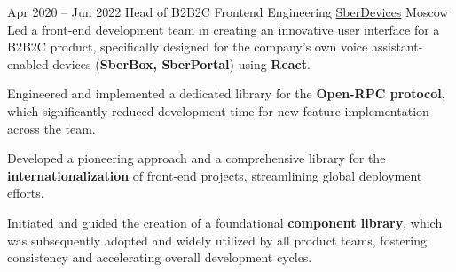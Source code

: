 \cventry
{Apr 2020 – Jun 2022}
{Head of B2B2C Frontend Engineering}
{\href{https://sberdevices.ru}{SberDevices}}
{Moscow}
{}
{Led a front-end development team in creating an innovative user interface for a B2B2C product, specifically designed for the company's own voice assistant-enabled devices (\textbf{SberBox, SberPortal}) using \textbf{React}.}

\cvlistitem
{Engineered and implemented a dedicated library for the \textbf{Open-RPC protocol}, which significantly reduced development time for new feature implementation across the team.}

\cvlistitem
{Developed a pioneering approach and a comprehensive library for the \textbf{internationalization} of front-end projects, streamlining global deployment efforts.}

\cvlistitem
{Initiated and guided the creation of a foundational \textbf{component library}, which was subsequently adopted and widely utilized by all product teams, fostering consistency and accelerating overall development cycles.}
